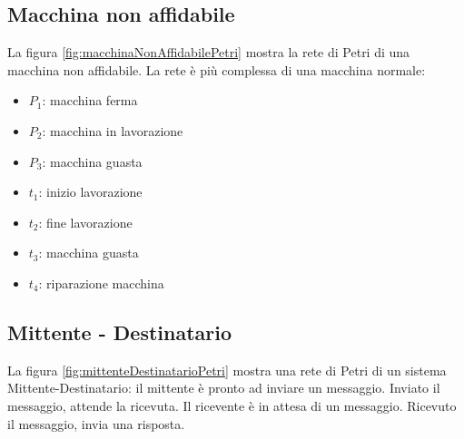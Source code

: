 \documentclass[a4paper]{report}
\begin{document}
\subsection{Macchina non affidabile}

La figura \ref{fig:macchinaNonAffidabilePetri} mostra la rete di Petri di
una macchina non affidabile. La rete \`e pi\`u complessa di una macchina
normale:
\begin{itemize}
\item $P_1$: macchina ferma
\item $P_2$: macchina in lavorazione
\item $P_3$: macchina guasta
\item $t_1$: inizio lavorazione
\item $t_2$: fine lavorazione
\item $t_3$: macchina guasta
\item $t_4$: riparazione macchina
\end{itemize}

\subsection{Mittente - Destinatario}

La figura \ref{fig:mittenteDestinatarioPetri} mostra una rete di Petri
di un sistema Mittente-Destinatario: il mittente \`e pronto ad inviare
un messaggio. Inviato il messaggio, attende la ricevuta. Il ricevente
\`e in attesa di un messaggio. Ricevuto il messaggio, invia una
risposta. 
\end{document}
